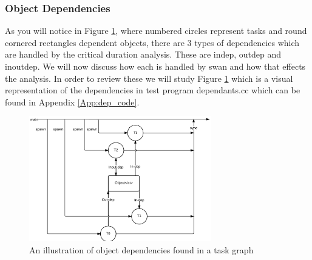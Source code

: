 \subsubsection{Object Dependencies}\label{section:obj_deps}
As you will notice in Figure \ref{fig:deps}, where numbered circles represent tasks and round cornered rectangles dependent objects, there are 3 types of dependencies which are handled by the critical duration analysis. These are indep, outdep and inoutdep. We will now discuss how each is handled by swan and how that effects the analysis. In order to review these we will study Figure \ref{fig:deps} which is a visual representation of the dependencies in test program dependants.cc which can be found in Appendix \ref{App:dep_code}.

\begin{figure}
	\centering
	\includegraphics[width=300px]{img/deps}
	\caption{An illustration of object dependencies found in a task graph}
	\label{fig:deps}
\end{figure}

